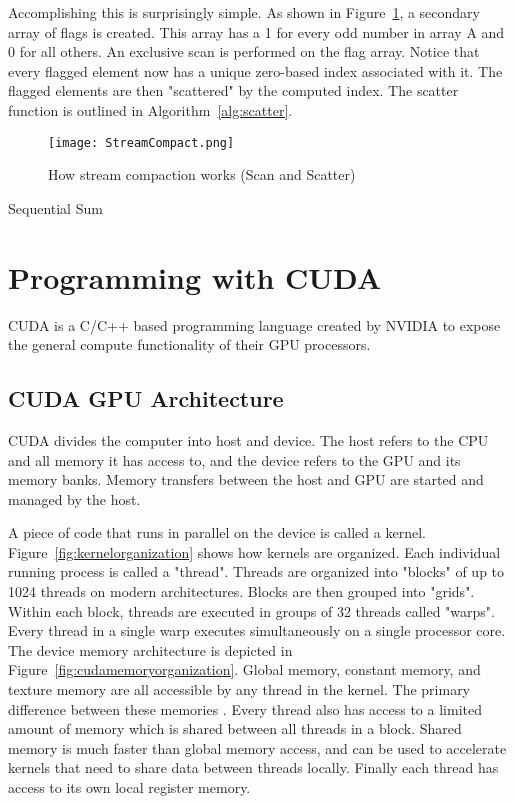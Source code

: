 Accomplishing this is surprisingly simple. As shown in Figure~\ref{fig:streamcompact}, a secondary array of flags is created. This array has a 1 for every odd number in array A and 0 for all others. An exclusive scan is performed on the flag array. Notice that every flagged element now has a unique zero-based index associated with it. The flagged elements are then "scattered" by the computed index. The scatter function is outlined in Algorithm~\ref{alg:scatter}.

\begin{figure}[!htpb]
    \centering
    \texttt{[image: StreamCompact.png]}
    \caption{How stream compaction works (Scan and Scatter)}
    \label{fig:streamcompact}
\end{figure}


\begin{algorithm}[!htpb]
\label{alg:scatter}
 \singlespacing
 \caption{Sequential Sum}
\end{algorithm}

\section{Programming with CUDA}
CUDA is a C/C++ based programming language created by NVIDIA to expose the general compute functionality of their GPU processors. 
\subsection{CUDA GPU Architecture}
CUDA divides the computer into host and device. The host refers to the CPU and all memory it has access to, and the device refers to the GPU and its memory banks. Memory transfers between the host and GPU are started and managed by the host.\par
A piece of code that runs in parallel on the device is called a kernel. Figure~\ref{fig:kernelorganization} shows how kernels are organized. Each individual running process is called a "thread". Threads are organized into "blocks" of up to 1024 threads on modern architectures. Blocks are then grouped into "grids". Within each block, threads are executed in groups of 32 threads called "warps". Every thread in a single warp executes simultaneously on a single processor core.
The device memory architecture is depicted in Figure~\ref{fig:cudamemoryorganization}. Global memory, constant memory, and texture memory are all accessible by any thread in the kernel. The primary difference between these memories . Every thread also has access to a limited amount of memory which is shared between all threads in a block. Shared memory is much faster than global memory access, and can be used to accelerate kernels that need to share data between threads locally. Finally each thread has access to its own local register memory.

